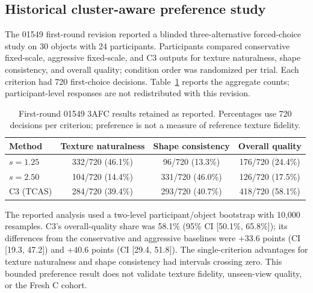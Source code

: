 \subsection*{Historical cluster-aware preference study}
\label{subsec:preference}

The 01549 first-round revision reported a blinded three-alternative forced-choice study on 30 objects with 24 participants. Participants compared conservative fixed-scale, aggressive fixed-scale, and C3 outputs for texture naturalness, shape consistency, and overall quality; condition order was randomized per trial. Each criterion had 720 first-choice decisions. Table~\ref{tab:preference} reports the aggregate counts; participant-level responses are not redistributed with this revision.

\begin{table}[t]
\centering\scriptsize
\caption{First-round 01549 3AFC results retained as reported. Percentages use 720 decisions per criterion; preference is not a measure of reference texture fidelity.}
\label{tab:preference}
\setlength{\tabcolsep}{3pt}
\begin{tabular}{lccc}
\toprule
Method & Texture naturalness & Shape consistency & Overall quality \\
\midrule
$s=1.25$ & 332/720 (46.1\%) & 96/720 (13.3\%) & 176/720 (24.4\%) \\
$s=2.50$ & 104/720 (14.4\%) & 331/720 (46.0\%) & 126/720 (17.5\%) \\
C3 (TCAS) & 284/720 (39.4\%) & 293/720 (40.7\%) & 418/720 (58.1\%) \\
\bottomrule
\end{tabular}
\end{table}

The reported analysis used a two-level participant/object bootstrap with 10,000 resamples. C3's overall-quality share was 58.1\% (95\% CI [50.1\%, 65.8\%]); its differences from the conservative and aggressive baselines were +33.6 points (CI [19.3, 47.2]) and +40.6 points (CI [29.4, 51.8]). The single-criterion advantages for texture naturalness and shape consistency had intervals crossing zero. This bounded preference result does not validate texture fidelity, unseen-view quality, or the Fresh C cohort.

